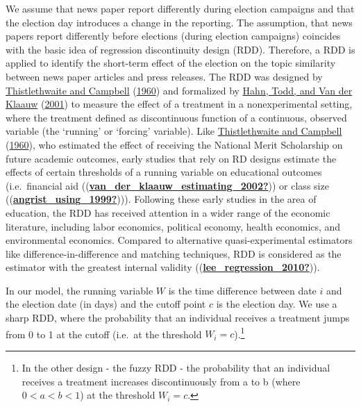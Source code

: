 \documentclass[
]{article}
\begin{document}
We assume that news paper report differently during election campaigns
and that the election day introduces a change in the reporting. The
assumption, that news papers report differently before elections (during
election campaigns) coincides with the basic idea of regression
discontinuity design (RDD). Therefore, a RDD is applied to identify the
short-term effect of the election on the topic similarity between news
paper articles and press releases. The RDD was designed by
\protect\hyperlink{ref-thistlethwaite_regression-discontinuity_1960}{Thistlethwaite
and Campbell}
(\protect\hyperlink{ref-thistlethwaite_regression-discontinuity_1960}{1960})
and formalized by \protect\hyperlink{ref-hahn_identification_2001}{Hahn,
Todd, and Van der Klaauw}
(\protect\hyperlink{ref-hahn_identification_2001}{2001}) to measure the
effect of a treatment in a nonexperimental setting, where the treatment
defined as discontinuous function of a continuous, observed variable
(the `running' or `forcing' variable). Like
\protect\hyperlink{ref-thistlethwaite_regression-discontinuity_1960}{Thistlethwaite
and Campbell}
(\protect\hyperlink{ref-thistlethwaite_regression-discontinuity_1960}{1960}),
who estimated the effect of receiving the National Merit Scholarship on
future academic outcomes, early studies that rely on RD designs estimate
the effects of certain thresholds of a running variable on educational
outcomes (i.e.~financial aid
((\protect\hyperlink{ref-van_der_klaauw_estimating_2002}{\textbf{van\_der\_klaauw\_estimating\_2002?}}))
or class size
((\protect\hyperlink{ref-angrist_using_1999}{\textbf{angrist\_using\_1999?}}))).
Following these early studies in the area of education, the RDD has
received attention in a wider range of the economic literature,
including labor economics, political economy, health economics, and
environmental economics. Compared to alternative quasi-experimental
estimators like difference-in-difference and matching techniques, RDD is
considered as the estimator with the greatest internal validity
((\protect\hyperlink{ref-lee_regression_2010}{\textbf{lee\_regression\_2010?}})).

In our model, the running variable \(W\) is the time difference between
date \(i\) and the election date (in days) and the cutoff point \(c\) is
the election day. We use a sharp RDD, where the probability that an
individual receives a treatment jumps from 0 to 1 at the cutoff (i.e.~at
the threshold
\(W_i = c\)).\footnote{In the other design - the fuzzy RDD - the probability that an individual receives a treatment increases discontinuously from a to b (where $0 <a < b < 1$) at the threshold $W_i = c$.}
\end{document}
